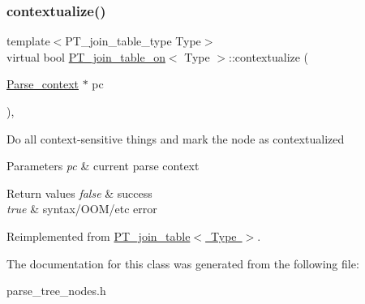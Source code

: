 \subsubsection{\texorpdfstring{contextualize()}{contextualize()}}
{\footnotesize\ttfamily template$<$P\+T\+\_\+join\+\_\+table\+\_\+type Type$>$ \\
virtual bool \mbox{\hyperlink{classPT__join__table__on}{P\+T\+\_\+join\+\_\+table\+\_\+on}}$<$ Type $>$\+::contextualize (\begin{DoxyParamCaption}\item[{\mbox{\hyperlink{structParse__context}{Parse\+\_\+context}} $\ast$}]{pc }\end{DoxyParamCaption})\hspace{0.3cm}{\ttfamily [inline]}, {\ttfamily [virtual]}}

Do all context-\/sensitive things and mark the node as contextualized


\begin{DoxyParams}{Parameters}
{\em pc} & current parse context\\
\hline
\end{DoxyParams}

\begin{DoxyRetVals}{Return values}
{\em false} & success \\
\hline
{\em true} & syntax/\+O\+O\+M/etc error \\
\hline
\end{DoxyRetVals}


Reimplemented from \mbox{\hyperlink{classPT__join__table_aa012b30af4f4d06a215c95d5417dba78}{P\+T\+\_\+join\+\_\+table$<$ Type $>$}}.



The documentation for this class was generated from the following file\+:\begin{DoxyCompactItemize}
\item 
parse\+\_\+tree\+\_\+nodes.\+h\end{DoxyCompactItemize}
